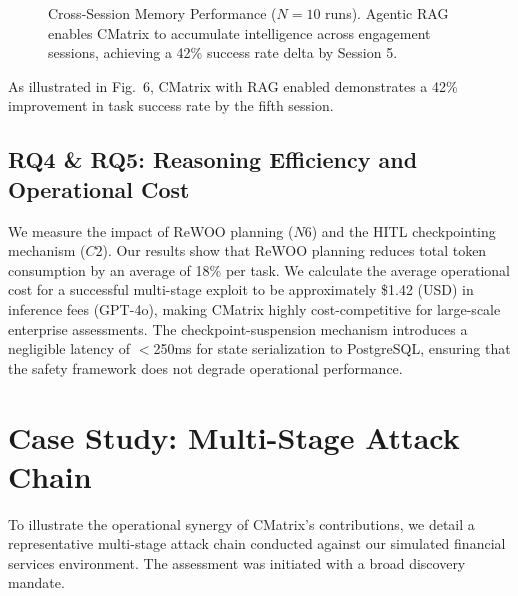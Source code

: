 \documentclass[conference,compsoc]{IEEEtran}
\begin{document}
\begin{figure}[htbp]
\centering
{}
\caption{Cross-Session Memory Performance ($N=10$ runs). Agentic RAG enables CMatrix to accumulate intelligence across engagement sessions, achieving a 42\% success rate delta by Session 5.}
\label{fig:rag_gain}
\end{figure}

As illustrated in Fig.~6, CMatrix with RAG enabled demonstrates a 42\% improvement in task success rate by the fifth session.

\subsection{RQ4 \& RQ5: Reasoning Efficiency and Operational Cost}
We measure the impact of ReWOO planning ($N6$) and the HITL checkpointing mechanism ($C2$). Our results show that ReWOO planning reduces total token consumption by an average of 18\% per task. We calculate the average operational cost for a successful multi-stage exploit to be approximately \$1.42 (USD) in inference fees (GPT-4o), making CMatrix highly cost-competitive for large-scale enterprise assessments. The checkpoint-suspension mechanism introduces a negligible latency of $<$250ms for state serialization to PostgreSQL, ensuring that the safety framework does not degrade operational performance.

\section{Case Study: Multi-Stage Attack Chain}
To illustrate the operational synergy of CMatrix's contributions, we detail a representative multi-stage attack chain conducted against our simulated financial services environment. The assessment was initiated with a broad discovery mandate.
\end{document}
